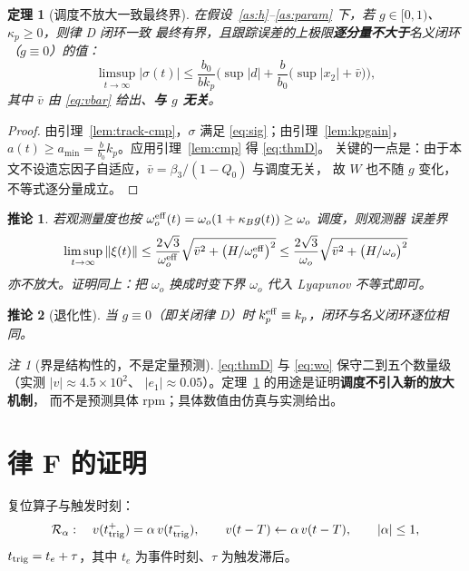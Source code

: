 \documentclass[11pt,a4paper]{article}
\newtheorem{theorem}{定理}
\newtheorem{corollary}{推论}
\theoremstyle{remark}
\newtheorem{remark}{注}
\begin{document}
\begin{theorem}[调度不放大一致最终界]\label{thm:lawd}
在假设~\ref{as:h}--\ref{as:param} 下，若 $g\in[0,1)$、$\kappa_p\ge0$，则律 D 闭环一致
最终有界，且跟踪误差的上极限\textbf{逐分量不大于}名义闭环（$g\equiv0$）的值：
\begin{equation}
\limsup_{t\to\infty}|\sigma(t)|\le \frac{b_0}{b k_p}\Big(\sup|d|+\frac{b}{b_0}\big(\sup|x_2|+\bar v\big)\Big),
\label{eq:thmD}
\end{equation}
其中 $\bar v$ 由 \eqref{eq:vbar} 给出、\textbf{与 $g$ 无关}。
\end{theorem}
\begin{proof}
由引理~\ref{lem:track-cmp}，$\sigma$ 满足 \eqref{eq:sig}；由引理~\ref{lem:kpgain}，
$a(t)\ge a_{\min}=\frac{b}{b_0}k_p$。应用引理~\ref{lem:cmp} 得 \eqref{eq:thmD}。
关键的一点是：由于本文不设遗忘因子自适应，$\bar v=\beta_3/(1-Q_0)$ 与调度无关，
故 $W$ 也不随 $g$ 变化，不等式逐分量成立。
\end{proof}

\begin{corollary}\label{cor:kd}
若观测量度也按 $\omega_o^{\rm eff}(t)=\omega_o(1+\kappa_B g(t))\ge\omega_o$ 调度，则观测器
误差界
\begin{equation}
\limsup_{t\to\infty}\|\xi(t)\|\le\frac{2\sqrt3}{\omega_o^{\rm eff}}\sqrt{\bar v^{2}+\big(H/\omega_o^{\rm eff}\big)^{2}}
\le\frac{2\sqrt3}{\omega_o}\sqrt{\bar v^{2}+\big(H/\omega_o\big)^{2}}
\label{eq:wo}
\end{equation}
亦不放大。证明同上：把 $\omega_o$ 换成时变下界 $\omega_o$ 代入 Lyapunov 不等式即可。
\end{corollary}

\begin{corollary}[退化性]\label{cor:off}
当 $g\equiv0$（即关闭律 D）时 $k_p^{\rm eff}\equiv k_p$，闭环与名义闭环逐位相同。
\end{corollary}

\begin{remark}[界是结构性的，不是定量预测]\label{rem:conservative}
\eqref{eq:thmD} 与 \eqref{eq:wo} 保守二到五个数量级（实测 $|v|\approx4.5\times10^2$、
$|e_1|\approx0.05$）。定理~\ref{thm:lawd} 的用途是证明\textbf{调度不引入新的放大机制}，
而不是预测具体 rpm；具体数值由仿真与实测给出。
\end{remark}

\section{律 F 的证明}\label{sec:lawf}
复位算子与触发时刻：
\begin{equation}
\mathcal R_\alpha:\quad v(t_{\rm trig}^+)=\alpha\,v(t_{\rm trig}^-),\qquad
v(t-T)\leftarrow\alpha\,v(t-T),\qquad |\alpha|\le1,
\label{eq:reset}
\end{equation}
$t_{\rm trig}=t_e+\tau$，其中 $t_e$ 为事件时刻、$\tau$ 为触发滞后。
\end{document}
